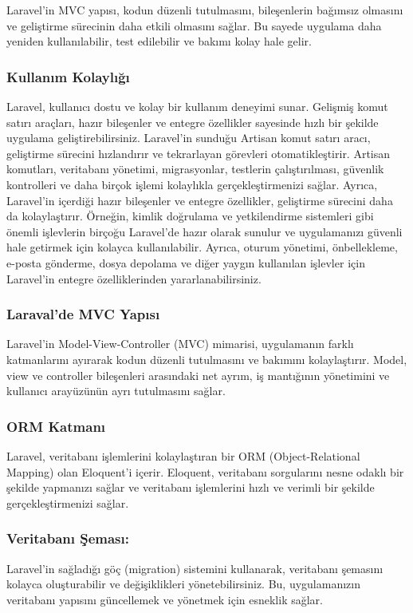 Laravel'in MVC yapısı, kodun düzenli tutulmasını, bileşenlerin bağımsız olmasını ve geliştirme sürecinin daha etkili olmasını sağlar. Bu sayede uygulama daha yeniden kullanılabilir, test edilebilir ve bakımı kolay hale gelir.
\subsubsection{Kullanım Kolaylığı}
Laravel, kullanıcı dostu ve kolay bir kullanım deneyimi sunar. Gelişmiş komut satırı araçları, hazır bileşenler ve entegre özellikler sayesinde hızlı bir şekilde uygulama geliştirebilirsiniz. Laravel'in sunduğu Artisan komut satırı aracı, geliştirme sürecini hızlandırır ve tekrarlayan görevleri otomatikleştirir. Artisan komutları, veritabanı yönetimi, migrasyonlar, testlerin çalıştırılması, güvenlik kontrolleri ve daha birçok işlemi kolaylıkla gerçekleştirmenizi sağlar.
Ayrıca, Laravel'in içerdiği hazır bileşenler ve entegre özellikler, geliştirme sürecini daha da kolaylaştırır. Örneğin, kimlik doğrulama ve yetkilendirme sistemleri gibi önemli işlevlerin birçoğu Laravel'de hazır olarak sunulur ve uygulamanızı güvenli hale getirmek için kolayca kullanılabilir. Ayrıca, oturum yönetimi, önbellekleme, e-posta gönderme, dosya depolama ve diğer yaygın kullanılan işlevler için Laravel'in entegre özelliklerinden yararlanabilirsiniz.
\subsubsection{Laraval'de MVC Yapısı }
Laravel'in Model-View-Controller (MVC) mimarisi, uygulamanın farklı katmanlarını ayırarak kodun düzenli tutulmasını ve bakımını kolaylaştırır. Model, view ve controller bileşenleri arasındaki net ayrım, iş mantığının yönetimini ve kullanıcı arayüzünün ayrı tutulmasını sağlar.
\subsubsection{ORM Katmanı }Laravel, veritabanı işlemlerini kolaylaştıran bir ORM (Object-Relational Mapping) olan Eloquent'i içerir. Eloquent, veritabanı sorgularını nesne odaklı bir şekilde yapmanızı sağlar ve veritabanı işlemlerini hızlı ve verimli bir şekilde gerçekleştirmenizi sağlar.
\subsubsection{Veritabanı Şeması:} Laravel'in sağladığı göç (migration) sistemini kullanarak, veritabanı şemasını kolayca oluşturabilir ve değişiklikleri yönetebilirsiniz. Bu, uygulamanızın veritabanı yapısını güncellemek ve yönetmek için esneklik sağlar.
